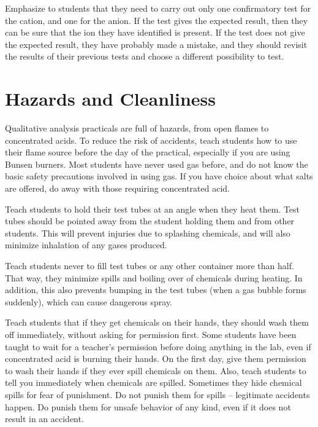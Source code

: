Emphasize to students that they need to carry out 
only one confirmatory test for the cation, 
and one for the anion. 
If the test gives the expected result, 
then they can be sure that the ion they have identified is present. 
If the test does not give the expected result, 
they have probably made a mistake, 
and they should revisit the results of their previous tests 
and choose a different possibility to test.

\section{Hazards and Cleanliness}
Qualitative analysis practicals are full of hazards, 
from open flames to concentrated acids. 
To reduce the risk of accidents, 
teach students how to use their flame source 
before the day of the practical, 
especially if you are using Bunsen burners. 
Most students have never used gas before, 
and do not know the basic safety precautions involved in using gas. 
If you have choice about what salts are offered, 
do away with those requiring concentrated acid.

Teach students to hold their test tubes at an angle when they heat them. 
Test tubes should be pointed away from the student holding them 
and from other students. 
This will prevent injuries due to splashing chemicals, 
and will also minimize inhalation of any gases produced.

Teach students never to fill test tubes 
or any other container more than half. 
That way, 
they minimize spills and boiling over of chemicals during heating. 
In addition, 
this also prevents bumping in the test tubes 
(when a gas bubble forms suddenly), 
which can cause dangerous spray.

Teach students that if they get chemicals on their hands, 
they should wash them off immediately, 
without asking for permission first. 
Some students have been taught to wait for a teacher's permission 
before doing anything in the lab, 
even if concentrated acid is burning their hands. 
On the first day, 
give them permission to wash their hands 
if they ever spill chemicals on them. 
Also, 
teach students to tell you immediately when chemicals are spilled. 
Sometimes they hide chemical spills for fear of punishment. 
Do not punish them for spills -- legitimate accidents happen. 
Do punish them for unsafe behavior of any kind, 
even if it does not result in an accident. 

